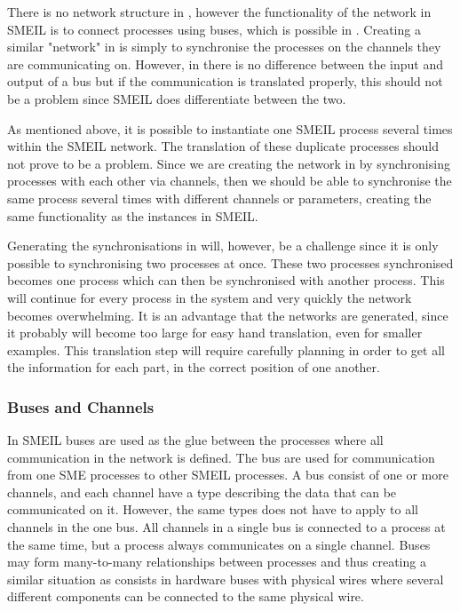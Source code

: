 There is no network structure in \cspm{}, however the functionality of the network in SMEIL is to connect processes using buses, which is possible in \cspm{}. Creating a similar "network" in \cspm{} is simply to synchronise the processes on the channels they are communicating on. However, in \cspm{} there is no difference between the input and output of a bus but if the communication is translated properly, this should not be a problem since SMEIL does differentiate between the two.
%
%

As mentioned above, it is possible to instantiate one SMEIL process several times within the SMEIL network. The translation of these duplicate processes should not prove to be a problem. Since we are creating the network in \cspm{} by synchronising processes with each other via channels, then we should be able to synchronise the same process several times with different channels or parameters, creating the same functionality as the instances in SMEIL.

Generating the synchronisations in \cspm{} will, however, be a challenge since it is only possible to synchronising two processes at once. These two processes synchronised becomes one process which can then be synchronised with another process. This will continue for every process in the system and very quickly the network becomes overwhelming. It is an advantage that the \cspm{} networks are generated, since it probably will become too large for easy hand translation, even for smaller examples.
This translation step will require carefully planning in order to get all the information for each part, in the correct position of one another.

\subsubsection{Buses and Channels}
In SMEIL buses are used as the glue between the processes where all communication in the network is defined. The bus are used for communication from one SME processes to other SMEIL processes. A bus consist of one or more channels, and each channel have a type describing the data that can be communicated on it. However, the same types does not have to apply to all channels in the one bus. All channels in a single bus is connected to a process at the same time, but a process always communicates on a single channel.
Buses may form many-to-many relationships between processes and thus creating a similar situation as consists in hardware buses with physical wires where several different components can be connected to the same physical wire.

